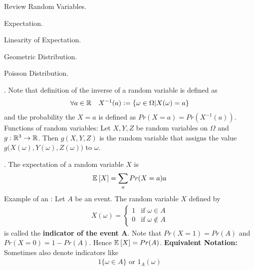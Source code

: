 \documentclass[12pt]{article}
\newcommand{\myspace}{\vspace{2\bigskipamount}}
\newcommand\p{\Needspace{12\baselineskip} \noindent}
\begin{document}

\p {}
\begin{compactitem}[$\rightarrow$]
	\item Review Random Variables.
	\item Expectation.
	\item Linearity of Expectation.
	\item Geometric Distribution.
	\item Poisson Distribution.
\end{compactitem}

\p {}. Note that definition of the inverse of a random variable is defined as 
\begin{align}
\forall a \in \mathbb{R} \quad X^{-1}(a) := \{\omega \in \Omega | X(\omega) = a\}
\end{align}
and the probability the $X = a$ is defined as $Pr(X = a) = Pr(X^{-1}(a))$. Functions of random variables: Let $X, Y, Z$ be random variables on $\Omega$ and $g: \mathbb{R}^3\rightarrow \mathbb{R}$. Then $g(X, Y, Z)$ is the random variable that assigns the value $g\big(	X(\omega), Y(\omega), Z(\omega) \big)$ to $\omega$. 

\myspace
\p {}. The expectation of a random variable $X$ is 
\begin{align}
\mathbb{E}_{}\left[X\right] = \sum_a Pr(X = a) a
\end{align}
Example of an : Let $A$ be an event. The random variable $X$ defined by 
\begin{align}
	X(\omega) = \begin{cases}
		1 & \text{if } \omega \in A \\
		0 &  \text{if } \omega \notin A 
	\end{cases}
\end{align}
is called the \textbf{indicator of the event A}. Note that $Pr(X = 1) = Pr(A)$ and $Pr(X = 0) = 1 - Pr(A)$. Hence $\mathbb{E}_{}\left[X\right] = Pr(A)$. \textbf{Equivalent Notation:} Sometimes also denote indicators like
\begin{align}
1 \{\omega \in A \} \text{ or } 1_A(\omega)
\end{align}
\end{document}
